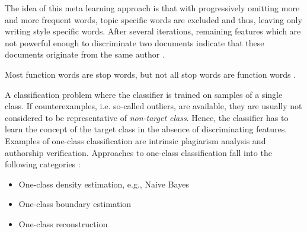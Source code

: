 \begin{definition}
    [Unmasking]
    The idea of this meta learning approach is that with progressively omitting more and more frequent words, 
    topic specific words are excluded and thus, leaving only writing style specific words.
    After several iterations, remaining features which are not powerful enough to discriminate two documents indicate that 
    these documents originate from the same author \cite{stein_intrinsic_2011}.
\end{definition}

\begin{definition}
    Most function words are stop words, but not all stop words are function words \cite{stein_intrinsic_2011}.
\end{definition}

\begin{definition}
    A classification problem where the classifier is trained on samples of a single class.
    If counterexamples, i.e. so-called outliers, are available, they are usually not considered to be representative of \textit{non-target class}.
    Hence, the classifier has to learn the concept of the target class in the absence of discriminating features.
    Examples of one-class classification are intrinsic plagiarism analysis and authorship verification.
    Approaches to one-class classification fall into the following categories \cite{stein_intrinsic_2011}:
    \begin{itemize}
        \item One-class density estimation, e.g., Naive Bayes
        \item One-class boundary estimation
        \item One-class reconstruction
    \end{itemize}
\end{definition}